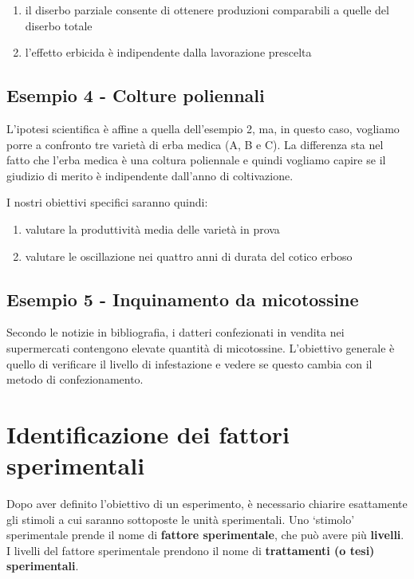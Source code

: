 \documentclass[a4paper,12pt,oneside]{book}
\providecommand{\tightlist}{%
  \setlength{\itemsep}{0pt}\setlength{\parskip}{0pt}}
\theoremstyle{definition}
\theoremstyle{definition}
\theoremstyle{definition}
\theoremstyle{remark}
\begin{document}
\begin{enumerate}
\def\labelenumi{\arabic{enumi}.}
\tightlist
\item
  il diserbo parziale consente di ottenere produzioni comparabili a
  quelle del diserbo totale
\item
  l'effetto erbicida è indipendente dalla lavorazione prescelta
\end{enumerate}

\subsection{Esempio 4 - Colture
poliennali}\label{esempio-4---colture-poliennali}

L'ipotesi scientifica è affine a quella dell'esempio 2, ma, in questo
caso, vogliamo porre a confronto tre varietà di erba medica (A, B e C).
La differenza sta nel fatto che l'erba medica è una coltura poliennale e
quindi vogliamo capire se il giudizio di merito è indipendente dall'anno
di coltivazione.

I nostri obiettivi specifici saranno quindi:

\begin{enumerate}
\def\labelenumi{\arabic{enumi}.}
\tightlist
\item
  valutare la produttività media delle varietà in prova
\item
  valutare le oscillazione nei quattro anni di durata del cotico erboso
\end{enumerate}

\subsection{Esempio 5 - Inquinamento da
micotossine}\label{esempio-5---inquinamento-da-micotossine}

Secondo le notizie in bibliografia, i datteri confezionati in vendita
nei supermercati contengono elevate quantità di micotossine. L'obiettivo
generale è quello di verificare il livello di infestazione e vedere se
questo cambia con il metodo di confezionamento.

\section{Identificazione dei fattori
sperimentali}\label{identificazione-dei-fattori-sperimentali}

Dopo aver definito l'obiettivo di un esperimento, è necessario chiarire
esattamente gli stimoli a cui saranno sottoposte le unità sperimentali.
Uno `stimolo' sperimentale prende il nome di \textbf{fattore
sperimentale}, che può avere più \textbf{livelli}. I livelli del fattore
sperimentale prendono il nome di \textbf{trattamenti (o tesi)
sperimentali}.
\end{document}
